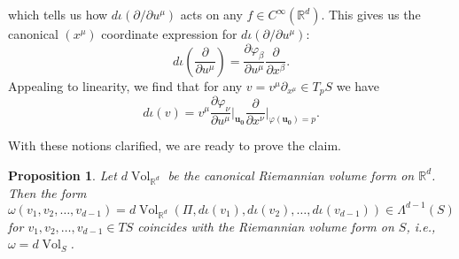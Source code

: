 \documentclass{article}
\newcommand{\p}{\partial}
\newcommand{\R}{\mathbb{R}}
\newcommand{\f}[2]{\frac{#1}{#2}}
\theoremstyle{theorem}
\newtheorem{proposition}[theorem]{Proposition}
\newcommand{\Vol}{\operatorname{Vol}}
\begin{document}
which tells us how $d\iota(\partial/\partial u^\mu)$ acts on any $f\in C^{\infty}(\R^d)$. This gives us the canonical $(x^\mu)$ coordinate expression for $d\iota(\partial/\partial u^{\mu})$:
\begin{equation*}
d\iota\left(\frac{\partial}{\partial u^{\mu}}\right)=\frac{\partial\varphi_\beta}{\partial u^{\mu}}\frac{\partial}{\partial x^\beta}.
\end{equation*}
Appealing to linearity, we find that for any $v = v^\mu \p_{x^\mu} \in T_p S$ we have
\begin{equation*}
d\iota(v)= v^\mu\f{\p \varphi_\nu}{\p u^\mu}\bigg\vert_{\mathbf{u_0}} \f{\p }{\p x^\nu}\bigg\vert_{\varphi(\mathbf{u_0}) = p}.
\end{equation*}



With these notions clarified, we are ready to prove the claim.
\begin{proposition}\label{prop:dVolsCoincide}
Let $d\Vol_{\mathbb{R}^d}$ be the canonical Riemannian volume form on $\mathbb{R}^d$. Then the form
\begin{equation*}
\omega(v_1,v_2,\dots,v_{d-1})=d\Vol_{\mathbb{R}^d}(\Pi,d\iota(v_1),d\iota(v_2),\dots,d\iota(v_{d-1})) \in \Lambda^{d-1}(S)
\end{equation*}
for $v_1,v_2,\dots,v_{d-1}\in TS$ coincides with the Riemannian volume form on $S$, i.e., $\omega=d\Vol_S$.
\end{proposition}
\end{document}
